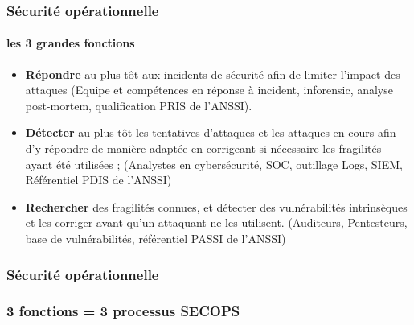 \begin{frame}
\frametitle<presentation>{Sécurité opérationnelle}
\framesubtitle<presentation>{les 3 grandes fonctions }
\begin{itemize}
  \item \textbf{Répondre} au plus tôt aux incidents de sécurité afin de limiter l'impact des attaques (Equipe et compétences en réponse à incident, inforensic, analyse post-mortem, qualification PRIS de l'ANSSI).
  \item \textbf{Détecter} au plus tôt les tentatives d'attaques et les attaques en cours afin d'y répondre de manière adaptée en corrigeant si nécessaire les fragilités ayant été utilisées ; (Analystes en cybersécurité, SOC, outillage Logs, SIEM, Référentiel PDIS de l'ANSSI)
  \item \textbf{Rechercher} des fragilités connues, et  détecter des vulnérabilités intrinsèques  et les corriger avant qu'un attaquant ne les utilisent. (Auditeurs, Pentesteurs, base de vulnérabilités, référentiel PASSI de l'ANSSI)
\end{itemize}
\end{frame}



\begin{frame}
\frametitle<presentation>{Sécurité opérationnelle}
\end{frame}




\begin{frame}
\frametitle<presentation>{3 fonctions = 3 processus SECOPS}





\end{frame}


